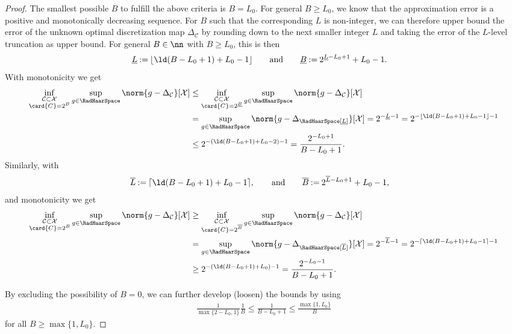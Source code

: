 \documentclass[twoside,11pt]{article}
\newcommand{\defeq}{\mathbin{:=}}
\newcommand{\set}[1]{\ensuremath{\mathcal{#1}}}
\begin{document}
\begin{proof}
    The smallest possible $B$ to fulfill the above criteria is $B=L_0$.
    For general $B\geq L_0$, we know that the approximation error is a positive and monotonically decreasing sequence.
    For $B$ such that the corresponding $L$ is non-integer, we can therefore upper bound the error of the unknown optimal discretization map $\Delta_\mathcal{C}$ by rounding down to the next smaller integer $L$ and taking the error of the $L$-level truncation as upper bound.
    For general $B\in\nn$ with $B\geq L_0$, this is then
    \begin{align}
        \underline{L}&\defeq \lfloor \ld(B-L_0+1)+L_0-1\rfloor\qquad\text{and}\qquad
        \underline{B}\defeq 2^{\underline{L}-L_0+1}+L_0-1.
    \end{align}
    With monotonicity we get
    \begin{align}
        \inf_{\substack{\set{C}\subset \set{X}\\\card{C}=2^B}}
        \sup_{g\in\RadHaarSpace}
        \norm{g-\Delta_\set{C}}[\set{X}]
        &\leq
        \inf_{\substack{\set{C}\subset \set{X}\\\card{C}=2^{\underline{B}}}}
        \sup_{g\in\RadHaarSpace}\norm{g-\Delta_\set{C}}[\set{X}]
        \\&
        =
        \sup_{g\in\RadHaarSpace}\norm{g-\Delta_{\RadHaarSpace[\underline{L}]}}[\set{X}]
        =
        2^{-\underline{L}-1}
        =
        2^{-\lfloor\ld(B-L_0+1)+L_0-1\rfloor-1}
        \\&
        \leq 
        2^{-(\ld(B-L_0+1)+L_0-2)-1}
        =
        \frac{2^{-L_0+1}}{B-L_0+1}.
    \end{align}
    Similarly, with
    \begin{align}
        \overline{L}&\defeq \lceil \ld(B-L_0+1)+L_0-1\rceil,\qquad\text{and}\qquad
        \overline{B}\defeq 2^{\overline{L}-L_0+1}+L_0-1,
    \end{align}
    and monotonicity we get
    \begin{align}
        \inf_{\substack{\set{C}\subset \set{X}\\\card{C}=2^B}}
        \sup_{g\in\RadHaarSpace}
        \norm{g-\Delta_\set{C}}[\set{X}]
        &\geq
        \inf_{\substack{\set{C}\subset \set{X}\\\card{C}=2^{\overline{B}}}}
        \sup_{g\in\RadHaarSpace}\norm{g-\Delta_\set{C}}[\set{X}]
        \\&
        =
        \sup_{g\in\RadHaarSpace}\norm{g-\Delta_{\RadHaarSpace[\overline{L}]}}[\set{X}]
        =
        2^{-\overline{L}-1}
        =
        2^{-\lceil\ld(B-L_0+1)+L_0-1\rceil-1}
        \\&
        \geq 
        2^{-(\ld(B-L_0+1)+L_0)-1}
        =
        \frac{2^{-L_0-1}}{B-L_0+1}.
    \end{align}

    By excluding the possibility of $B=0$, we can further develop (loosen) the bounds by using
    \begin{align}
        \frac{1}{\max\{2-L_0,1\}}\frac{1}{B}
        \leq
        \frac{1}{B-L_0+1}
        \leq
        \frac{\max\{1,L_0\}}{B}
    \end{align}
    for all $B\geq \max\{1,L_0\}$.
\end{proof}
\end{document}
